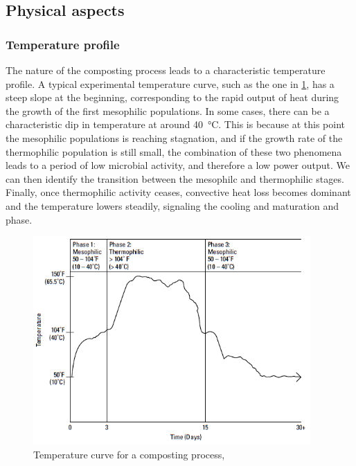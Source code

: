 \documentclass[12pt, a4paper, twocolumn, twoside]{article}
\numberwithin{table}{section}
\numberwithin{figure}{section}
\numberwithin{equation}{section}
\begin{document}
\subsection{Physical aspects}
\subsubsection{Temperature profile}\label{sec:temperatura}
The nature of the composting process leads to a characteristic temperature profile. A typical experimental temperature curve, such as the one in \cref{fig:corba model}, has a steep slope at the beginning, corresponding to the rapid output of heat during the growth of the first mesophilic populations. In some cases, there can be a characteristic dip in temperature at around \SI{40}{\celsius}. This is because at this point the mesophilic populations is reaching stagnation, and if the growth rate of the thermophilic population is still small, the combination of these two phenomena leads to a period of low microbial activity, and therefore a low power output. We can then identify the transition between the mesophilc and thermophilic stages. Finally, once thermophilic activity ceases, convective heat loss becomes dominant and the temperature lowers steadily, signaling the cooling and maturation and phase. 

\begin{figure}[htb]
	\sffamily \footnotesize \centering
	\includegraphics[scale=0.55]{model-T.jpg}
	\caption{Temperature curve for a composting process, \cite{dummies}}
	\label{fig:corba model}
\end{figure}
\end{document}
